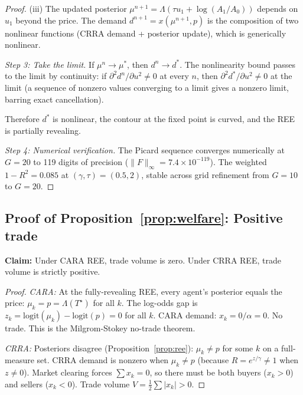 \documentclass[12pt,letterpaper]{article}
\theoremstyle{definition}
\theoremstyle{remark}
\newcommand{\Lam}{\Lambda}            %
\newcommand{\logit}{\mathrm{logit}}
\newcommand{\Tstar}{T^{\!\star}}
\newcommand{\1}{\mathbf{1}}
\begin{document}
\begin{proof}
(iii) The updated posterior
$\mu^{n+1} = \Lam(\tau u_1 + \log(A_1/A_0))$ depends on $u_1$ beyond
the price. The demand $d^{n+1} = x(\mu^{n+1}, p)$ is the composition of
two nonlinear functions (CRRA demand + posterior update), which is
generically nonlinear.

\emph{Step 3: Take the limit.}
If $\mu^n \to \mu^*$, then $d^n \to d^*$. The nonlinearity bound passes
to the limit by continuity: if $\partial^2 d^n / \partial u^2 \neq 0$
at every $n$, then $\partial^2 d^* / \partial u^2 \neq 0$ at the limit
(a sequence of nonzero values converging to a limit gives a nonzero
limit, barring exact cancellation).

Therefore $d^*$ is nonlinear, the contour at the fixed point is curved,
and the REE is partially revealing.

\emph{Step 4: Numerical verification.}
The Picard sequence converges numerically at $G = 20$ to 119 digits
of precision ($\|F\|_\infty = 7.4 \times 10^{-119}$). The weighted
$1 - R^2 = 0.085$ at $(\gamma, \tau) = (0.5, 2)$, stable across grid
refinement from $G = 10$ to $G = 20$.
\end{proof}

\subsection*{Proof of Proposition~\ref{prop:welfare}: Positive trade}

\textbf{Claim:} Under CARA REE, trade volume is zero. Under CRRA REE,
trade volume is strictly positive.

\begin{proof}
\emph{CARA:} At the fully-revealing REE, every agent's posterior equals
the price: $\mu_k = p = \Lam(\Tstar)$ for all $k$. The log-odds gap is
$z_k = \logit(\mu_k) - \logit(p) = 0$ for all $k$. CARA demand:
$x_k = 0/\alpha = 0$. No trade. This is the Milgrom-Stokey no-trade
theorem.

\emph{CRRA:} Posteriors disagree (Proposition~\ref{prop:ree}):
$\mu_k \neq p$ for some $k$ on a full-measure set. CRRA demand is
nonzero when $\mu_k \neq p$ (because $R = e^{z/\gamma} \neq 1$ when
$z \neq 0$). Market clearing forces $\sum x_k = 0$, so there must be
both buyers ($x_k > 0$) and sellers ($x_k < 0$). Trade volume
$V = \frac{1}{2}\sum |x_k| > 0$.
\end{proof}

\end{document}
